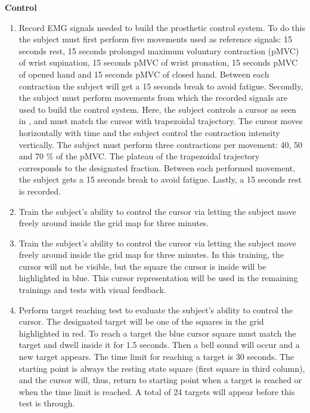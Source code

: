 \textbf{{Control}} \\
\vspace{-25pt}
\begin{enumerate}
	\item Record EMG signals needed to build the prosthetic control system. To do this the subject must first perform  five movements used as reference signals: 15 seconds rest, 15 seconds prolonged maximum voluntary contraction (pMVC) of wrist supination, 15 seconds pMVC of wrist pronation, 15 seconds pMVC of opened hand and 15 seconds pMVC of closed hand. Between each contraction the subject will get a 15 seconds break to avoid fatigue. Secondly, the subject must perform movements from which the recorded signals are used to build the control system. Here, the subject controls a cursor as seen in , and must match the cursor with trapezoidal trajectory. The cursor moves horizontally with time and the subject control the contraction intensity vertically. The subject must perform three contractions per movement: 40, 50 and 70 \% of the pMVC. The plateau of the trapezoidal trajectory corresponds to the designated fraction. Between each performed movement, the subject gets a 15 seconds break to avoid fatigue. Lastly, a 15 seconds rest is recorded. 
	\item Train the subject's ability to control the cursor via letting the subject move freely around inside the grid map for three minutes.
	\item Train the subject's ability to control the cursor via letting the subject move freely around inside the grid map for three minutes. In this training, the cursor will not be visible, but the square the cursor is inside will be highlighted in blue. This cursor representation will be used in the remaining trainings and tests with visual feedback.
	\item Perform target reaching test to evaluate the subject's ability to control the cursor. The designated target will be one of the squares in the grid highlighted in red. To reach a target the blue cursor square must match the target and dwell inside it for 1.5 seconds. Then a bell sound will occur and a new target appears. The time limit for reaching a target is 30 seconds. The starting point is always the resting state square (first square in third column), and the cursor will, thus, return to starting point when a target is reached or when the time limit is reached. A total of 24 targets will appear before this test is through.
\end{enumerate}

